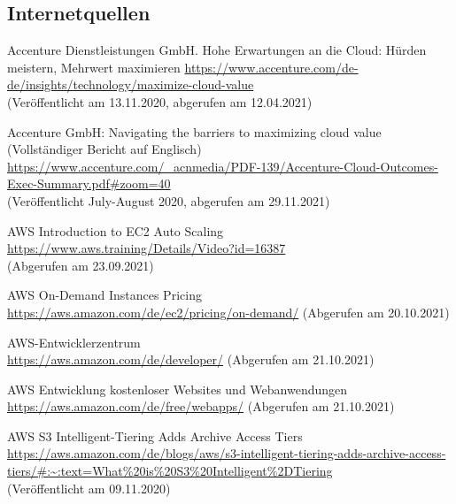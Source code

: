 \subsection*{Internetquellen}
\begin{thebibliography}{HR08} %
  Accenture Dienstleistungen GmbH. Hohe Erwartungen an die Cloud: Hürden meistern, Mehrwert maximieren 
  \url{https://www.accenture.com/de-de/insights/technology/maximize-cloud-value}\\
  (Veröffentlicht am 13.11.2020, abgerufen am 12.04.2021)
  
  Accenture GmbH: Navigating the barriers to maximizing cloud value (Vollständiger Bericht auf Englisch)\\
  \url{https://www.accenture.com/_acnmedia/PDF-139/Accenture-Cloud-Outcomes-Exec-Summary.pdf#zoom=40}\\
  (Veröffentlicht July-August 2020, abgerufen am 29.11.2021)

  AWS Introduction to EC2 Auto Scaling\\
  \url{https://www.aws.training/Details/Video?id=16387}\\
  (Abgerufen am 23.09.2021)

  AWS On-Demand Instances Pricing \\
  \url{https://aws.amazon.com/de/ec2/pricing/on-demand/}
  (Abgerufen am 20.10.2021)

  AWS-Entwicklerzentrum \\
  \url{https://aws.amazon.com/de/developer/}
  (Abgerufen am 21.10.2021)

  AWS Entwicklung kostenloser Websites
  und Webanwendungen   \\
  \url{https://aws.amazon.com/de/free/webapps/}
  (Abgerufen am 21.10.2021)


   AWS S3 Intelligent-Tiering Adds Archive Access Tiers \\
  \url{https://aws.amazon.com/de/blogs/aws/s3-intelligent-tiering-adds-archive-access-tiers/#:~:text=What%20is%20S3%20Intelligent%2DTiering}\\
  (Veröffentlicht am 09.11.2020)


\end{thebibliography}
